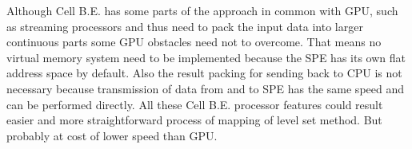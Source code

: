 \par
Although Cell B.E. has some parts of the approach in common with GPU, such as streaming processors and thus need to pack the input data into larger continuous parts some GPU obstacles need not to overcome.
That means no virtual memory system need to be implemented because the SPE has its own flat address space by default.
Also the result packing for sending back to CPU is not necessary because transmission of data from and to SPE has the same speed and can be performed directly.
All these Cell B.E. processor features could result easier and more straightforward process of mapping of level set method.
But probably at cost of lower speed than GPU.